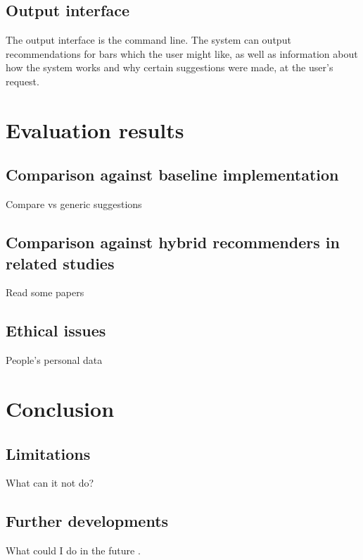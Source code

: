 \documentclass[conference]{IEEEtran}
\begin{document}
\subsection{Output interface}
The output interface is the command line.
The system can output recommendations for bars which the user might like,
as well as information about how the system works and why certain suggestions were made,
at the user's request.


\section{Evaluation results}

\subsection{Comparison against baseline implementation}
Compare vs generic suggestions

\subsection{Comparison against hybrid recommenders in related studies}
Read some papers

\subsection{Ethical issues}
People's personal data


\section{Conclusion}

\subsection{Limitations}
What can it not do?

\subsection{Further developments}
What could I do in the future \cite{5284958}. 




\end{document}
